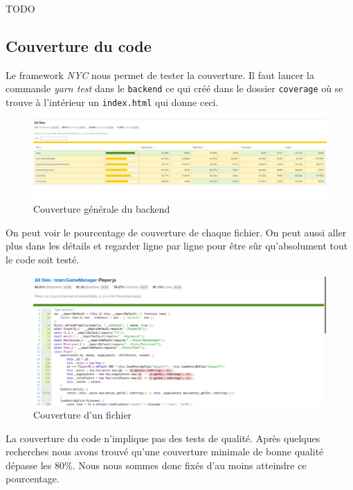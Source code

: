 TODO

\subsection{Couverture du code}

Le framework \emph{NYC} nous permet de tester la couverture. Il faut lancer la commande \emph{yarn test} dans le \lstinline{backend} ce qui créé dans le dossier \lstinline{coverage} où se trouve à l'intérieur un \lstinline{index.html} qui donne ceci.

\begin{figure}[H]
    \centering
    \includegraphics[scale=0.35]{data/couverture_test_1.jpg}
    \caption{Couverture générale du backend}
\end{figure}

On peut voir le pourcentage de couverture de chaque fichier. On peut aussi aller plus dans les détails et regarder ligne par ligne pour être sûr qu'absolument tout le code soit testé.

\begin{figure}[H]
    \centering
    \includegraphics[scale=0.3]{data/couverture_test_2.png}
    \caption{Couverture d'un fichier}
\end{figure}

La couverture du code n'implique pas des tests de qualité. Après quelques recherches nous avons trouvé qu'une couverture minimale de bonne qualité dépasse les 80\%. Nous nous sommes donc fixés d'au moins atteindre ce pourcentage.